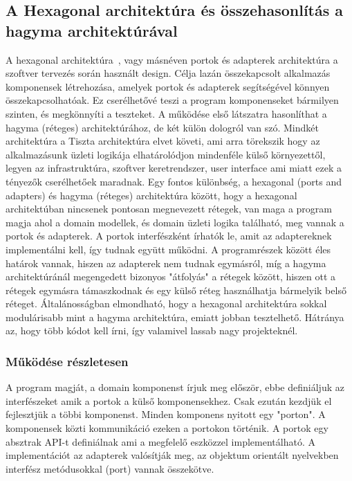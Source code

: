 \subsection{A Hexagonal architektúra és összehasonlítás a hagyma architektúrával}\label{subsec:a-hexagonal-architektúráról-bővebben}
A hexagonal architektúra~\cite{hexagonal}, vagy másnéven portok és adapterek architektúra a szoftver tervezés során használt design.
Célja lazán összekapcsolt alkalmazás komponensek létrehozása, amelyek portok és adapterek segítségével könnyen összekapcsolhatóak.
Ez cserélhetővé teszi a program komponenseket bármilyen szinten, és megkönnyíti a teszteket.
A működése első látszatra hasonlíthat a hagyma (réteges) architektúrához, de két külön dologról van szó.
Mindkét architektúra a Tiszta architektúra \cite{clean-architecture} elvet követi, ami arra törekszik hogy az alkalmazásunk üzleti logikája elhatárolódjon mindenféle külső környezettől, legyen az infrastruktúra, szoftver keretrendszer, user interface ami miatt ezek a tényezők cserélhetőek maradnak.
Egy fontos különbség, a hexagonal (ports and adapters) és hagyma (réteges) architektúra között, hogy a hexagonal architektúban nincsenek pontosan megnevezett rétegek, van maga a program magja ahol a domain modellek, és domain üzleti logika található, meg vannak a portok és adapterek.
A portok interfészként írhatók le, amit az adaptereknek implementálni kell, így tudnak együtt működni.
A programrészek között éles határok vannak, hiszen az adapterek nem tudnak egymásról, míg a hagyma architektúránál megengedett bizonyos "átfolyás" a rétegek között, hiszen ott a rétegek egymásra támaszkodnak és egy külső réteg használhatja bármelyik belső réteget.
Általánosságban elmondható, hogy a hexagonal architektúra sokkal modulárisabb mint a hagyma architektúra, emiatt jobban tesztelhető.
Hátránya az, hogy több kódot kell írni, így valamivel lassab nagy projekteknél.

\subsubsection{Működése részletesen}
A program magját, a domain komponenst írjuk meg először, ebbe definiáljuk az interfészeket amik a portok a külső komponensekhez.
Csak ezután kezdjük el fejlesztjük a többi komponenst.
Minden komponens nyitott egy "porton".
A komponensek közti kommunikáció ezeken a portokon történik.
A portok egy absztrak API-t definiálnak ami a megfelelő eszközzel implementálható\cite{hexagonal}.
A implementációt az adapterek valósítják meg, az objektum orientált nyelvekben interfész metódusokkal (port) vannak összekötve.


